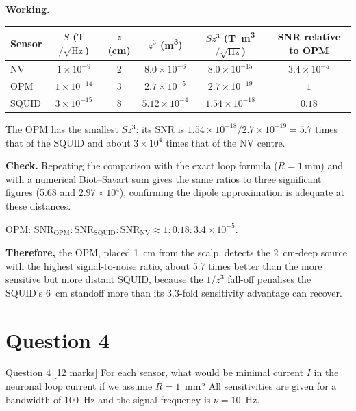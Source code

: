 \documentclass[11pt]{article}
\newcommand{\closing}[1]{\par\medskip\noindent\textbf{Therefore,} #1}
\newcommand{\sqHz}{\ensuremath{/\sqrt{\mathrm{Hz}}}}
\begin{document}
\textbf{Working.}
\begin{center}
\begin{tabular}{lccccc}
\toprule
Sensor & $S$ (\si{\tesla}\sqHz) & $z$ (cm) & $z^3$ (\si{\metre\cubed}) & $S z^3$ (\si{\tesla\metre\cubed}\sqHz) & SNR relative to OPM \\
\midrule
NV    & $1\times10^{-9}$  & 2 & $8.0\times10^{-6}$ & $8.0\times10^{-15}$ & $3.4\times10^{-5}$ \\
OPM   & $1\times10^{-14}$ & 3 & $2.7\times10^{-5}$ & $2.7\times10^{-19}$ & $1$ \\
SQUID & $3\times10^{-15}$ & 8 & $5.12\times10^{-4}$ & $1.54\times10^{-18}$ & $0.18$ \\
\bottomrule
\end{tabular}
\end{center}
The OPM has the smallest $S z^3$: its SNR is $1.54\times10^{-18}/2.7\times10^{-19} = 5.7$ times that
of the SQUID and about $3\times10^{4}$ times that of the NV centre.

\textbf{Check.} Repeating the comparison with the exact loop formula ($R=\SI{1}{\milli\metre}$) and
with a numerical Biot--Savart sum gives the same ratios to three significant figures (5.68 and
$2.97\times10^4$), confirming the dipole approximation is adequate at these distances.

\begin{answerbox}
OPM: $\mathrm{SNR}_{\mathrm{OPM}} : \mathrm{SNR}_{\mathrm{SQUID}} : \mathrm{SNR}_{\mathrm{NV}}
\approx 1 : 0.18 : 3.4\times10^{-5}$.
\closing{the OPM, placed \SI{1}{\centi\metre} from the scalp, detects the \SI{2}{\centi\metre}-deep
source with the highest signal-to-noise ratio, about 5.7 times better than the more sensitive but
more distant SQUID, because the $1/z^3$ fall-off penalises the SQUID's \SI{6}{\centi\metre} standoff
more than its 3.3-fold sensitivity advantage can recover.}
\end{answerbox}

\section{Question 4}

\begin{problembox}{Question 4 \hfill [12 marks]}
For each sensor, what would be minimal current $I$ in the neuronal loop current if we assume
$R = 1$~mm? All sensitivities are given for a bandwidth of $100$~Hz and the signal frequency is
$\nu = 10$~Hz.
\end{problembox}
\end{document}
